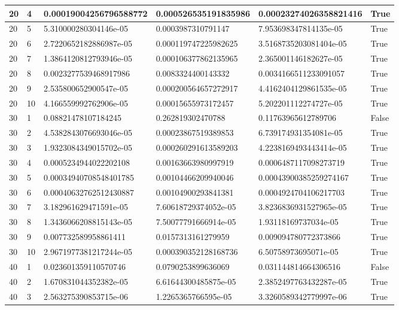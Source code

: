 \documentclass[a4paper, 12pt]{report}
\def\tabsize{4.4cm}
\def\stabsize{0.97cm}
\def\mtabsize{0.73cm}
\begin{document}
\begin{center}
\begin{longtable}{|m{\stabsize}|m{\stabsize}|m{\tabsize}|m{\tabsize}|m{\tabsize}|m{\mtabsize}|}
20 & 4 & 0.00019004256796588772 & 0.000526535191835986 & 0.00023274026358821416 & True \\ \hline  
20 & 5 & 5.310000280304146e-05 & 0.0003987310791147 & 7.953698347814135e-05 & True \\ \hline  
20 & 6 & 2.7220652182886987e-05 & 0.000119747225982625 & 3.5168735203081404e-05 & True \\ \hline  
20 & 7 & 1.3864120812793946e-05 & 0.000106377862135965 & 2.365001146182627e-05 & True \\ \hline  
20 & 8 & 0.0023277539468917986 & 0.0083324400143332 & 0.0034166511233091057 & True \\ \hline  
20 & 9 & 2.535800652900547e-05 & 0.000200564657272917 & 4.4162404129861535e-05 & True \\ \hline  
20 & 10 & 4.166559992762906e-05 & 0.00015655973172457 & 5.202201112274727e-05 & True \\ \hline  
30 & 1 & 0.08821478107184245 & 0.262819302470788 & 0.11763965612789706 & False \\ \hline  
30 & 2 & 4.5382843076693046e-05 & 0.00023867519389853 & 6.739174931354081e-05 & True \\ \hline  
30 & 3 & 1.9323084349015702e-05 & 0.000260291613589203 & 4.2238169493443414e-05 & True \\ \hline  
30 & 4 & 0.0005234944022202108 & 0.00163663980997919 & 0.0006487117098273719 & True \\ \hline  
30 & 5 & 0.00034940708548401785 & 0.00104466209940046 & 0.00043900385259274167 & True \\ \hline  
30 & 6 & 0.00040632762512430887 & 0.00104900293841381 & 0.0004924704106217703 & True \\ \hline  
30 & 7 & 3.182961629471591e-05 & 7.60618729374052e-05 & 3.8236836931527965e-05 & True \\ \hline  
30 & 8 & 1.3436066208815143e-05 & 7.50077791666914e-05 & 1.93118169737034e-05 & True \\ \hline  
30 & 9 & 0.007732589958861411 & 0.0157313161279959 & 0.009094780772373866 & True \\ \hline  
30 & 10 & 2.9671977381217244e-05 & 0.000390352128168736 & 6.50758973695071e-05 & True \\ \hline  
40 & 1 & 0.023601359110570746 & 0.0790253899636069 & 0.031144814664306516 & False \\ \hline  
40 & 2 & 1.670831044352382e-05 & 6.61644300485875e-05 & 2.3852497763432287e-05 & True \\ \hline  
40 & 3 & 2.563275390853715e-06 & 1.2265365766595e-05 & 3.3260589342779997e-06 & True \\ \hline  

\end{longtable}
\end{center}
\end{document}
